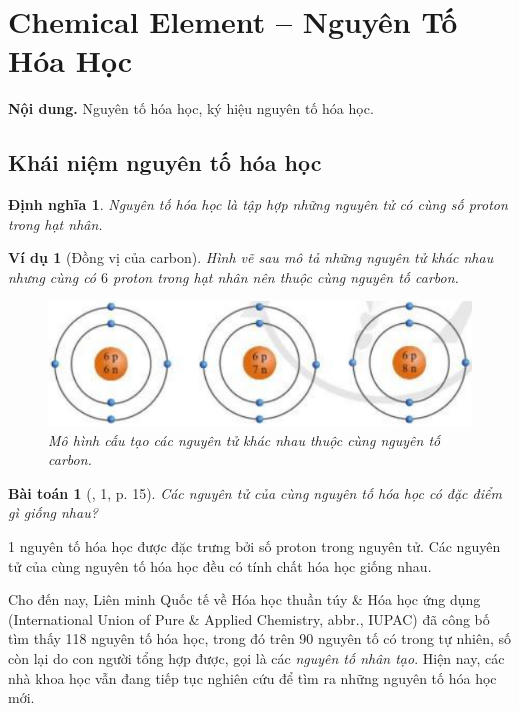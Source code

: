\documentclass{article}
\newtheorem{baitoan}{Bài toán}
\newtheorem{dinhnghia}{Định nghĩa}
\newtheorem{vidu}{Ví dụ}
\begin{document}

\section{Chemical Element -- Nguyên Tố Hóa Học}
\textsf{\textbf{Nội dung.} Nguyên tố hóa học, ký hiệu nguyên tố hóa học.}

\subsection{Khái niệm nguyên tố hóa học}

\begin{dinhnghia}
	\emph{Nguyên tố hóa học} là tập hợp những nguyên tử có cùng số proton trong hạt nhân.
\end{dinhnghia}

\begin{vidu}[Đồng vị của carbon]
	Hình vẽ sau mô tả những nguyên tử khác nhau nhưng cùng có $6$ proton trong hạt nhân nên thuộc cùng nguyên tố carbon.
	\begin{figure}[H]
		\centering
		\includegraphics[scale=0.4]{carbon}
		\caption{Mô hình cấu tạo các nguyên tử khác nhau thuộc cùng nguyên tố carbon.}
	\end{figure}
\end{vidu}

\begin{baitoan}[\cite{SGK_KHTN_7_Canh_Dieu}, 1, p. 15]
	Các nguyên tử của cùng nguyên tố hóa học có đặc điểm gì giống nhau?
\end{baitoan}
1 nguyên tố hóa học được đặc trưng bởi số proton trong nguyên tử. Các nguyên tử của cùng nguyên tố hóa học đều có tính chất hóa học giống nhau.

Cho đến nay, Liên minh Quốc tế về Hóa học thuần túy \& Hóa học ứng dụng (International Union of Pure \& Applied Chemistry, abbr., IUPAC) đã công bố tìm thấy 118 nguyên tố hóa học, trong đó trên 90 nguyên tố có trong tự nhiên, số còn lại do con người tổng hợp được, gọi là các \textit{nguyên tố nhân tạo}. Hiện nay, các nhà khoa học vẫn đang tiếp tục nghiên cứu để tìm ra những nguyên tố hóa học mới.
\end{document}
